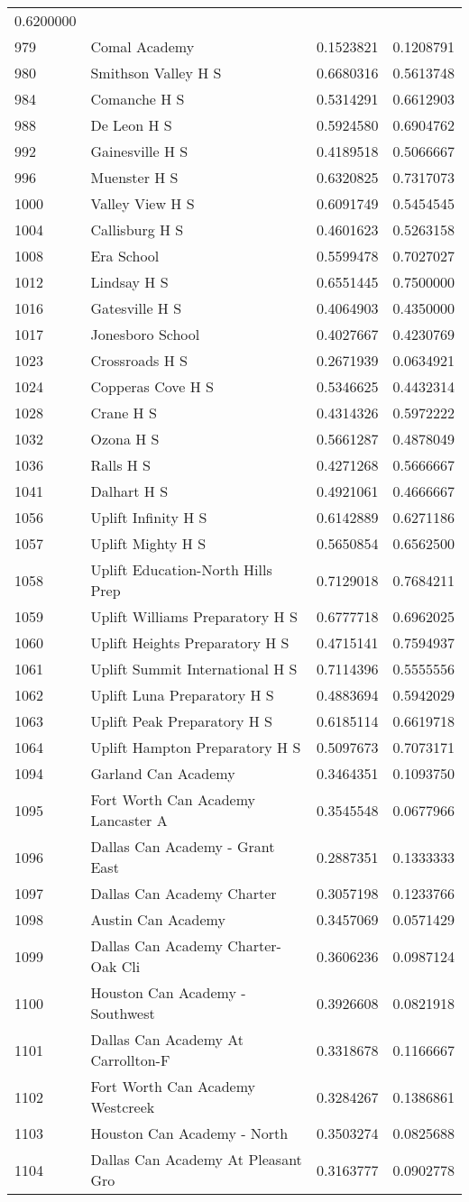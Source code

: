 \documentclass[
]{article}
\begin{document}
\begin{longtable}[]{@{}llrr@{}}
0.6200000\tabularnewline
979 & Comal Academy & 0.1523821 & 0.1208791\tabularnewline
980 & Smithson Valley H S & 0.6680316 & 0.5613748\tabularnewline
984 & Comanche H S & 0.5314291 & 0.6612903\tabularnewline
988 & De Leon H S & 0.5924580 & 0.6904762\tabularnewline
992 & Gainesville H S & 0.4189518 & 0.5066667\tabularnewline
996 & Muenster H S & 0.6320825 & 0.7317073\tabularnewline
1000 & Valley View H S & 0.6091749 & 0.5454545\tabularnewline
1004 & Callisburg H S & 0.4601623 & 0.5263158\tabularnewline
1008 & Era School & 0.5599478 & 0.7027027\tabularnewline
1012 & Lindsay H S & 0.6551445 & 0.7500000\tabularnewline
1016 & Gatesville H S & 0.4064903 & 0.4350000\tabularnewline
1017 & Jonesboro School & 0.4027667 & 0.4230769\tabularnewline
1023 & Crossroads H S & 0.2671939 & 0.0634921\tabularnewline
1024 & Copperas Cove H S & 0.5346625 & 0.4432314\tabularnewline
1028 & Crane H S & 0.4314326 & 0.5972222\tabularnewline
1032 & Ozona H S & 0.5661287 & 0.4878049\tabularnewline
1036 & Ralls H S & 0.4271268 & 0.5666667\tabularnewline
1041 & Dalhart H S & 0.4921061 & 0.4666667\tabularnewline
1056 & Uplift Infinity H S & 0.6142889 & 0.6271186\tabularnewline
1057 & Uplift Mighty H S & 0.5650854 & 0.6562500\tabularnewline
1058 & Uplift Education-North Hills Prep & 0.7129018 &
0.7684211\tabularnewline
1059 & Uplift Williams Preparatory H S & 0.6777718 &
0.6962025\tabularnewline
1060 & Uplift Heights Preparatory H S & 0.4715141 &
0.7594937\tabularnewline
1061 & Uplift Summit International H S & 0.7114396 &
0.5555556\tabularnewline
1062 & Uplift Luna Preparatory H S & 0.4883694 &
0.5942029\tabularnewline
1063 & Uplift Peak Preparatory H S & 0.6185114 &
0.6619718\tabularnewline
1064 & Uplift Hampton Preparatory H S & 0.5097673 &
0.7073171\tabularnewline
1094 & Garland Can Academy & 0.3464351 & 0.1093750\tabularnewline
1095 & Fort Worth Can Academy Lancaster A & 0.3545548 &
0.0677966\tabularnewline
1096 & Dallas Can Academy - Grant East & 0.2887351 &
0.1333333\tabularnewline
1097 & Dallas Can Academy Charter & 0.3057198 & 0.1233766\tabularnewline
1098 & Austin Can Academy & 0.3457069 & 0.0571429\tabularnewline
1099 & Dallas Can Academy Charter-Oak Cli & 0.3606236 &
0.0987124\tabularnewline
1100 & Houston Can Academy - Southwest & 0.3926608 &
0.0821918\tabularnewline
1101 & Dallas Can Academy At Carrollton-F & 0.3318678 &
0.1166667\tabularnewline
1102 & Fort Worth Can Academy Westcreek & 0.3284267 &
0.1386861\tabularnewline
1103 & Houston Can Academy - North & 0.3503274 &
0.0825688\tabularnewline
1104 & Dallas Can Academy At Pleasant Gro & 0.3163777 &
0.0902778\tabularnewline

\end{longtable}
\end{document}
